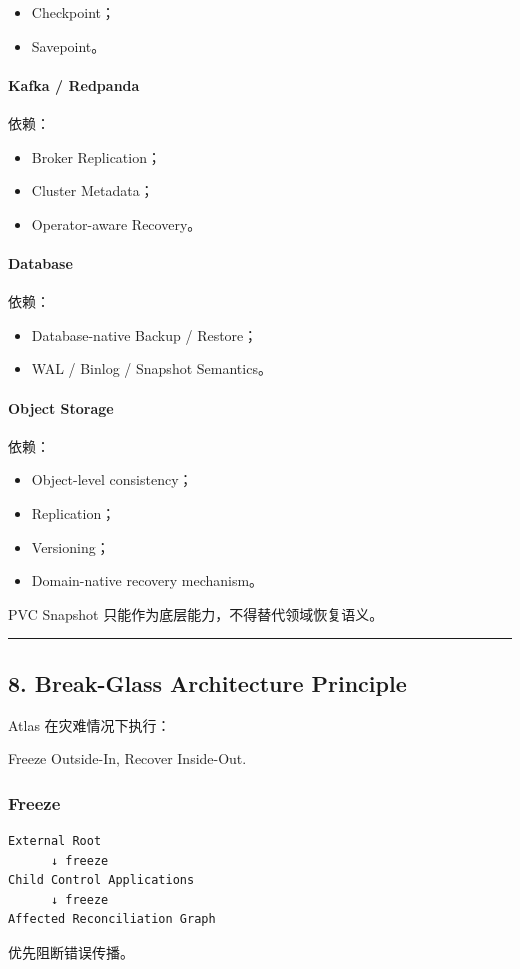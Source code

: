 \documentclass[11pt,a4paper]{article}
\begin{document}
\begin{itemize}
  \item Checkpoint；
  \item Savepoint。
\end{itemize}
\paragraph{Kafka / Redpanda}
依赖：

\begin{itemize}
  \item Broker Replication；
  \item Cluster Metadata；
  \item Operator-aware Recovery。
\end{itemize}
\paragraph{Database}
依赖：

\begin{itemize}
  \item Database-native Backup / Restore；
  \item WAL / Binlog / Snapshot Semantics。
\end{itemize}
\paragraph{Object Storage}
依赖：

\begin{itemize}
  \item Object-level consistency；
  \item Replication；
  \item Versioning；
  \item Domain-native recovery mechanism。
\end{itemize}
PVC Snapshot 只能作为底层能力，不得替代领域恢复语义。

\vspace{0.5em}\hrule\vspace{0.5em}
\subsection{8. Break-Glass Architecture Principle}
Atlas 在灾难情况下执行：

\begin{gfmBlockquote}
Freeze Outside-In, Recover Inside-Out.
\end{gfmBlockquote}
\subsubsection{Freeze}
\begin{lstlisting}[language=text]
External Root
      ↓ freeze
Child Control Applications
      ↓ freeze
Affected Reconciliation Graph
\end{lstlisting}
优先阻断错误传播。
\end{document}
